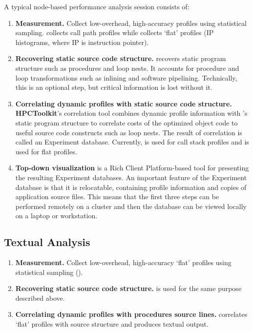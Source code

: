 \documentclass[english]{article}
\begin{document}
A typical node-based performance analysis session consists of:
\begin{enumerate}
\item \textbf{Measurement.}  
Collect low-overhead, high-accuracy profiles using statistical sampling.
 collects call path profiles while  collects `flat' profiles (IP histograms, where IP is instruction pointer).

\item \textbf{Recovering static source code structure.} 
 recovers static program structure such as procedures and loop nests.
It accounts for procedure and loop transformations such as inlining and software pipelining.
Technically, this is an optional step, but critical information is lost without it.

\item \textbf{Correlating dynamic profiles with static source code structure.} 
\textbf{HPCToolkit}'s correlation tool combines dynamic profile information with 's static program structure to correlate costs of the optimized object code to useful source code constructs such as loop nests.
The result of correlation is called an Experiment database.
Currently,  is used for call stack profiles and  is used for flat profiles.

\item \textbf{Top-down visualization}
 is a Rich Client Platform-based tool for presenting the resulting Experiment databases.
An important feature of the Experiment database is that it is relocatable, containing profile information and copies of application source files.
This means that the first three steps can be performed remotely on a cluster and then the database can be viewed locally on a laptop or workstation.
\end{enumerate}

\subsection{Textual Analysis}

\begin{enumerate}
\item \textbf{Measurement.}  
Collect low-overhead, high-accuracy `flat' profiles using statistical sampling ().

\item \textbf{Recovering static source code structure.} 
 is used for the same purpose described above.

\item \textbf{Correlating dynamic profiles with procedures source lines.} 
 correlates `flat' profiles with source structure and produces textual output.

\end{enumerate}
\end{document}
